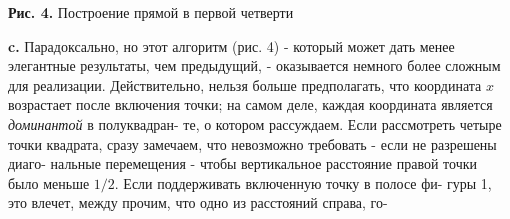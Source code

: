 \begin{center}
\textbf{Рис. 4.} Построение прямой в первой четверти
\end{center}
\hspace*{15pt}\textbf{c.} Парадоксально, но этот алгоритм (рис. 4) - который может\linebreak
дать менее элегантные результаты, чем предыдущий, - оказывается\linebreak
немного более сложным для реализации. Действительно, нельзя больше\linebreak
предполагать, что координата $x$ возрастает после включения точки; на\linebreak
самом деле, каждая координата является \textit{доминантой} в полуквадран-\linebreak
те, о котором рассуждаем. Если рассмотреть четыре точки квадрата,\linebreak
сразу замечаем, что невозможно требовать - если не разрешены диаго-\linebreak
нальные перемещения - чтобы вертикальное расстояние правой точки\linebreak
было меньше $1/2$. Если поддерживать включенную точку в полосе фи-\linebreak
гуры 1, это влечет, между прочим, что одно из расстояний справа, го-\linebreak
\newpage


